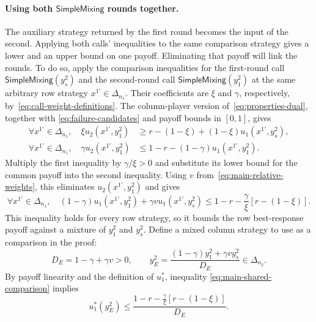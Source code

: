 \documentclass[11pt]{article}
\theoremstyle{remark}
\theoremstyle{plain}
\newcommand{\sm}{\mathsf{SimpleMixing}}
\begin{document}
\paragraph{Using both $\sm$ rounds together.}
The auxiliary strategy returned by the first round becomes the
input of the second. Applying both calls' inequalities to the same
comparison strategy gives a lower and an upper bound on one payoff.
Eliminating that payoff will link the rounds. To do so, apply
the comparison inequalities for the first-round call $\sm(y_s^2)$ and
the second-round call $\sm(y_1^2)$ at the same arbitrary row
strategy $x^{1\prime}\in\Delta_{n_1}$. Their coefficients are
$\xi$ and $\gamma$, respectively, by~\eqref{eq:call-weight-definitions}.
The column-player version
of~\eqref{eq:properties-dual}, together with
\eqref{eq:failure-candidates} and payoff bounds in $[0,1]$, gives
\begin{equation}
 \begin{aligned}
 \forall x^{1\prime}\in\Delta_{n_1},\quad
 \xi u_2(x^{1\prime},y_1^2)
   &\ge r-(1-\xi)+(1-\xi)u_1(x^{1\prime},y_s^2),\\
 \forall x^{1\prime}\in\Delta_{n_1},\quad
 \gamma u_2(x^{1\prime},y_1^2)
   &\le1-r-(1-\gamma)u_1(x^{1\prime},y_1^2).
 \end{aligned}
 \label{eq:main-shared-dual-instantiations}
\end{equation}
Multiply the first inequality by $\gamma/\xi>0$ and substitute
its lower bound for the common payoff into the second inequality.
Using $v$ from~\eqref{eq:main-relative-weights}, this eliminates
$u_2(x^{1\prime},y_1^2)$ and gives
\begin{equation}
 \forall x^{1\prime}\in\Delta_{n_1},\quad
 (1-\gamma)u_1(x^{1\prime},y_1^2)+\gamma v u_1(x^{1\prime},y_s^2)
 \le1-r-\frac\gamma\xi[r-(1-\xi)].
 \label{eq:main-shared-comparison}
\end{equation}
This inequality holds for every row strategy, so it bounds the row
best-response payoff against a mixture of $y_1^2$ and $y_s^2$.
Define a mixed column strategy to use as a comparison in the proof:
\begin{equation}
 D_E=1-\gamma+\gamma v>0,\qquad
 y_E^2=\frac{(1-\gamma)y_1^2+\gamma v y_s^2}{D_E}\in\Delta_{n_2}.
 \label{eq:main-column-comparison-mixture}
\end{equation}
By payoff linearity and the definition of $u_1^*$, inequality
\eqref{eq:main-shared-comparison} implies
\begin{equation}
 u_1^*(y_E^2)\le
 \frac{1-r-\frac\gamma\xi[r-(1-\xi)]}{D_E}.
 \label{eq:main-column-mixture-br-bound}
\end{equation}
\end{document}
